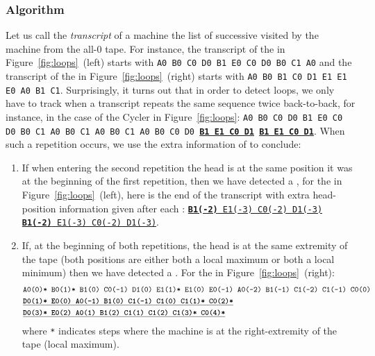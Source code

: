 \subsubsection{Algorithm}\label{sec:loops:algo}





Let us call the \textit{transcript} of a machine the list of successive \ssps visited by the machine from the all-0 tape. For instance, the transcript of the \cycler in Figure~\ref{fig:loops}~(left) starts with \texttt{A0 B0 C0 D0 B1 E0 C0 D0 B0 C1 A0} and the transcript of the \TC in Figure~\ref{fig:loops}~(right) starts with \texttt{A0 B0 B1 C0 D1 E1 E1 E0 A0 B1 C1}. Surprisingly, it turns out that in order to detect loops, we only have to track when a transcript repeats the same sequence twice back-to-back, for instance, in the case of the Cycler in Figure~\ref{fig:loops}: \texttt{A0 B0 C0 D0 B1 E0 C0 D0 B0 C1 A0 B0 C1 A0 B0 C1 A0 B0 C0 D0 \textbf{\underline{B1 E1 C0 D1}} \textbf{\underline{B1 E1 C0 D1}}}. When such a repetition occurs, we use the extra information of \headpos to conclude:

\begin{enumerate}
    \item If when entering the second repetition the head is at the same position it was at the beginning of the first repetition, then we have detected a \cycler, \eg for the \cycler in Figure~\ref{fig:loops}~(left), here is the end of the transcript with extra head-position information given after each \ssp: \texttt{\underline{\textbf{B1(-2)} E1(-3) C0(-2) D1(-3)} \underline{\textbf{B1(-2)} E1(-3) C0(-2) D1(-3)}}.

    \item If, at the beginning of both repetitions, the head is at the same extremity of the tape (\ie both positions are either both a local maximum or both a local minimum) then we have detected a \TC. For the \TC in Figure~\ref{fig:loops}~(right):
          \begin{align*}
               & \texttt{A0(0)* B0(1)* B1(0) C0(-1) D1(0) E1(1)* E1(0) E0(-1) A0(-2) B1(-1) C1(-2) C1(-1) C0(0)} \\
               & \texttt{\underline{\textbf{D0(1)* E0(0) A0(-1) B1(0) C1(-1) C1(0) C1(1)* C0(2)*}}}              \\
               & \texttt{\underline{\textbf{D0(3)* E0(2) A0(1) B1(2) C1(1) C1(2) C1(3)* C0(4)*}}}
          \end{align*}
          \noindent where \texttt{*} indicates steps where the machine is at the right-extremity of the tape (\headpos local maximum).


\end{enumerate}

